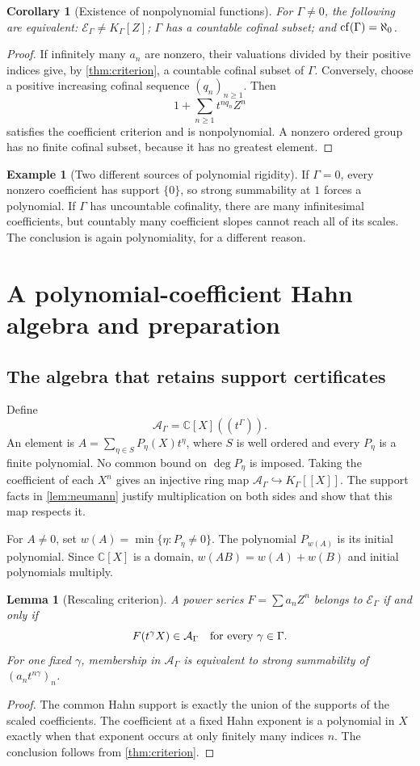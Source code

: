 \documentclass[11pt]{article}
\theoremstyle{plain}
\newtheorem{lemma}[lemma]{Lemma}
\theoremstyle{plain}
\theoremstyle{plain}
\newtheorem{corollary}[corollary]{Corollary}
\theoremstyle{definition}
\theoremstyle{definition}
\newtheorem{example}[example]{Example}
\theoremstyle{definition}
\theoremstyle{remark}
\newcommand{\C}{\mathbb C}\newcommand{\R}{\mathbb R}
\newcommand{\K}{K_\Gamma}\newcommand{\E}{\mathcal E_\Gamma}
\newcommand{\A}{\mathcal A_\Gamma}\newcommand{\OO}{\mathcal O_\Gamma}
\begin{document}
\begin{corollary}[Existence of nonpolynomial functions]\label{cor:cofinality}
For $\Gamma\ne0$, the following are equivalent: $\E\ne\K[Z]$;
$\Gamma$ has a countable cofinal subset; and $\operatorname{cf}(\Gamma)=\aleph_0$.
\end{corollary}
\begin{proof}
If infinitely many $a_n$ are nonzero, their valuations divided by their
positive indices give, by \cref{thm:criterion}, a countable cofinal
subset of $\Gamma$. Conversely, choose a positive increasing cofinal
sequence $(q_n)_{n\ge1}$. Then
\[
 1+\sum_{n\ge1}t^{nq_n}Z^n
\]
satisfies the coefficient criterion and is nonpolynomial. A nonzero
ordered group has no finite cofinal subset, because it has no greatest
element.
\end{proof}

\begin{example}[Two different sources of polynomial rigidity]
If $\Gamma=0$, every nonzero coefficient has support $\{0\}$, so strong
summability at $1$ forces a polynomial. If $\Gamma$ has uncountable
cofinality, there are many infinitesimal coefficients, but countably
many coefficient slopes cannot reach all of its scales. The conclusion
is again polynomiality, for a different reason.
\end{example}

\section{A polynomial-coefficient Hahn algebra and preparation}
\label{sec:prep}

\subsection{The algebra that retains support certificates}
Define
\[
 \A=\C[X]((t^\Gamma)).
\]
An element is $A=\sum_{\eta\in S}P_\eta(X)t^\eta$, where $S$ is well
ordered and every $P_\eta$ is a finite polynomial. No common bound on
$\deg P_\eta$ is imposed. Taking the coefficient of each $X^n$ gives
an injective ring map $\A\hookrightarrow\K[[X]]$.
The support facts in \cref{lem:neumann} justify multiplication on both
sides and show that this map respects it.

For $A\ne0$, set $w(A)=\min\{\eta:P_\eta\ne0\}$. The polynomial
$P_{w(A)}$ is its initial polynomial. Since $\C[X]$ is a domain,
$w(AB)=w(A)+w(B)$ and initial polynomials multiply.

\begin{lemma}[Rescaling criterion]\label{lem:rescaling}
A power series $F=\sum a_nZ^n$ belongs to $\E$ if and only if
\[
 F(t^\gamma X)\in\A\quad\hbox{for every }\gamma\in\Gamma.
\]
For one fixed $\gamma$, membership in $\A$ is equivalent to strong
summability of $(a_nt^{n\gamma})_n$.
\end{lemma}
\begin{proof}
The common Hahn support is exactly the union of the supports of the
scaled coefficients. The coefficient at a fixed Hahn exponent is a
polynomial in $X$ exactly when that exponent occurs at only finitely
many indices $n$. The conclusion follows from \cref{thm:criterion}.
\end{proof}
\end{document}
